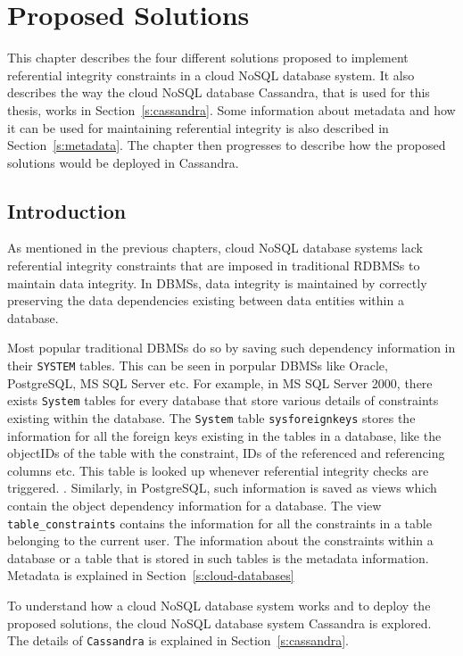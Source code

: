 \chapter{Proposed Solutions} \label{c:solutions}

This chapter describes the four different solutions proposed to implement
referential integrity constraints in a cloud \ac{NoSQL} database system. It also
describes the way the cloud \ac{NoSQL} database Cassandra, that is used
for this thesis, works in Section~\ref{s:cassandra}. Some information
about metadata and how it can be used for maintaining referential integrity is also described in
Section~\ref{s:metadata}. The chapter then progresses to describe how the
proposed solutions would be deployed in Cassandra.


\section{Introduction}

As mentioned in the previous chapters, cloud \ac{NoSQL} database systems lack
referential integrity constraints that are imposed in traditional \acp{RDBMS} to
maintain data integrity. In \acp{DBMS}, data integrity is maintained by
correctly preserving the data dependencies existing between data entities within
a database.

Most popular traditional \acp{DBMS} do so by saving such dependency information
in their \texttt{SYSTEM} tables. This can be seen in porpular \acp{DBMS} like
Oracle, PostgreSQL, MS SQL Server etc. For example, in MS SQL Server 2000, there
exists \texttt{System} tables for every database that store various details of
constraints existing within the database. The \texttt{System} table
\texttt{sysforeignkeys} stores the information for all the foreign keys existing
in the tables in a database, like the objectIDs of the table with the constraint,
IDs of the referenced and referencing columns etc. This table is looked up
whenever referential integrity checks are triggered. \citep{sys:msdn}.
Similarly, in PostgreSQL, such information is saved as views which contain the
object dependency information for a database. The view
\texttt{table\_constraints} contains the information for all the constraints in
a table belonging to the current user.%
The information about the constraints within a database or a table that is
stored in such tables is the metadata information. Metadata is explained in
 Section~\ref{s:cloud-databases}  

To understand how a cloud \ac{NoSQL} database system works and to deploy
the proposed solutions, the cloud \ac{NoSQL} database system Cassandra
is explored. The details of \texttt{Cassandra} is explained in
Section~\ref{s:cassandra}.

